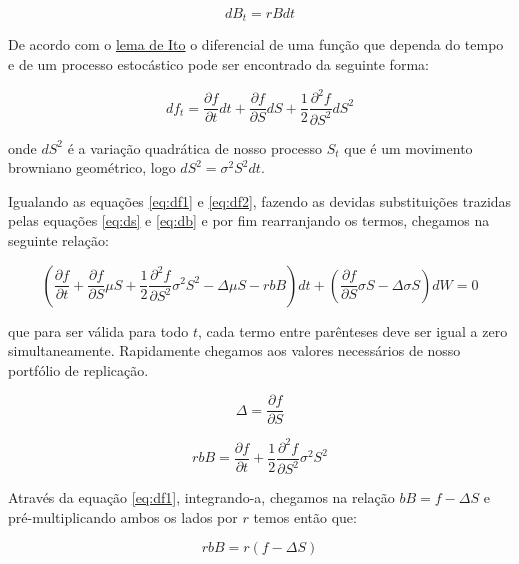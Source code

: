 \documentclass[]{book}
\begin{document}
\begin{equation}
dB_t=rBdt
\label{eq:db}
\end{equation}

De acordo com o
\href{https://pt.wikipedia.org/wiki/Lema_de_It\%C5\%8D}{lema de Ito} o
diferencial de uma função que dependa do tempo e de um processo
estocástico pode ser encontrado da seguinte forma:

\begin{equation}
df_t=\frac{\partial f}{\partial t}dt + \frac{\partial f}{\partial S}dS + \frac{1}{2}\frac{\partial^2 f}{\partial S^2}dS^2
\label{eq:df2}
\end{equation}

onde \(dS^2\) é a variação quadrática de nosso processo \(S_t\) que é um
movimento browniano geométrico, logo \(dS^2=\sigma^2S^2dt\).

Igualando as equações \eqref{eq:df1} e \eqref{eq:df2}, fazendo as devidas
substituições trazidas pelas equações \eqref{eq:ds} e \eqref{eq:db} e por
fim rearranjando os termos, chegamos na seguinte relação:

\begin{equation}
\left( \frac{\partial f}{\partial t} + \frac{\partial f}{\partial S}\mu S + \frac{1}{2}\frac{\partial^2 f}{\partial S^2}\sigma^2 S^2 - \Delta\mu S - rbB \right)dt + \left( \frac{\partial f}{\partial S}\sigma S - \Delta \sigma S \right)dW = 0 
\end{equation}

que para ser válida para todo \(t\), cada termo entre parênteses deve
ser igual a zero simultaneamente. Rapidamente chegamos aos valores
necessários de nosso portfólio de replicação.

\begin{equation}
\Delta = \frac{\partial f}{\partial S} 
\label{eq:delta}
\end{equation}

\begin{equation}
rbB = \frac{\partial f}{\partial t}+\frac{1}{2}\frac{\partial^2 f}{\partial S^2}\sigma^2S^2 
\label{eq:rbb1}
\end{equation}

Através da equação \eqref{eq:df1}, integrando-a, chegamos na relação
\(bB = f - \Delta S\) e pré-multiplicando ambos os lados por \(r\) temos
então que:

\begin{equation}
rbB = r(f-\Delta S) 
\label{eq:rbb2}
\end{equation}
\end{document}
